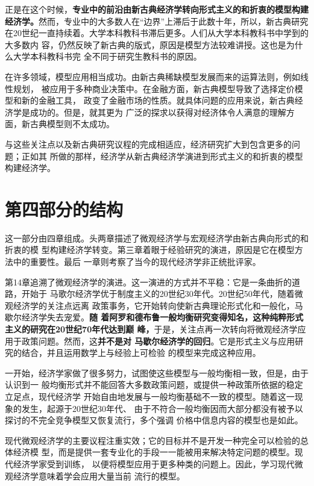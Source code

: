 正是在这个时候，\textbf{专业中的前沿由新古典经济学转向形式主义的和折衷的模型构建
  经济学。}然而，专业中的大多数人在“边界”上滞后于此数十年，所以，新古典研究
在20世纪一直持续着。大学本科教科书滞后更多。人们从大学本科教科书中学到的大多数内
容，仍然反映了新古典的版式，原因是模型方法较难讲授。这也是为什么大学本科教科书完
全不同于研究生教科书的原因。

在许多领域，模型应用相当成功。由新古典稀缺模型发展而来的运算法则，例如线性规划，
被应用于多种商业决策中。在金融方面，新古典模型导致了选择定价模型和新的金融工具，
政变了金融市场的性质。就具体问题的应用来说，新古典经济学是成功的。但是，就其更为
广泛的探求以获得对经济体令人满意的理解方面，新古典模型则不太成功。

与这些关注点以及新古典研究议程的完成相适应，经济研究扩大到包含更多的问题；正如其
所做的那样，经济学从新古典经济学演进到形式主义的和折衷的模型构建经济学。

\section*{第四部分的结构}

这一部分由四章组成。头两章描述了微观经济学与宏观经济学由新古典向形式的和折衷的模
型构建经济学转变。第三章着眼于经验研究的演进，原因是它在模型方法中的重要性。最后
一章则考察了当今的现代经济学非正统批评家。

第14章追溯了微观经济学的演进。这一演进的方式并不平稳：它是一条曲折的道路，开始于
马歌尔经济学优于制度主义的20世纪30年代。20世纪50年代，随着微观经济学的关注点远离
政策事务，它开始转向使新古典理论形式化和一般化，马歇尔经济学失去宠爱。\textbf{随
  着阿罗和德布鲁一般均衡研究变得知名，这种纯粹形式主义的研究在20世纪70年代达到巅
  峰，}于是，关注点再一次转向将微观经济学应用于政策问题。然而，这\textbf{并不是对
  马歇尔经济学的回归}。它是形式主义与应用研究的结合，并且运用数学上与经验上可检验
的模型来完成这种应用。

一开始，经济学家做了很多努力，试图使这些模型与一般均衡相一致，但是，由于认识到一
般均衡形式并不能回答大多数政策问题，或提供一种政策所依据的稳定立足点，现代经济学
开始自由地发展与一般均衡基础不一致的模型。随着这一现象的发生，起源于20世纪30年代、
由于不符合一般均衡因而大部分都没有被予以探讨的不完全竞争模型又恢复流行，多个强调
价格中信息内容的模型也是如此。

现代微观经济学的主要议程注重实效；它的目标并不是开发一种完全可以检验的总体经济模
型，而是提供一套专业化的手段一一能被用来解决特定问题的模型。现代经济学家受到训练，
以便将模型应用于更多种类的问题上。因此，学习现代微观经济学意味着学会应用大量当前
流行的模型。

